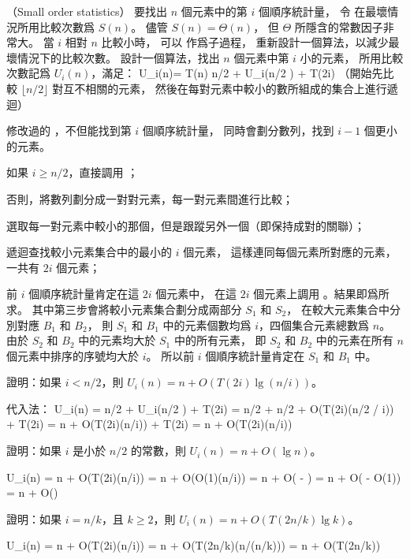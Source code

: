 \startPROBLEM
（Small order statistics）
要找出 $n$ 個元素中的第 $i$ 個順序統計量，
令  在最壞情況所用比較次數爲 $S(n)$。
儘管 $S(n)=\Theta(n)$，
但 $\Theta$ 所隱含的常數因子非常大。
當 $i$ 相對 $n$ 比較小時，
可以  作爲子過程，
重新設計一個算法，以減少最壞情況下的比較次數。
\startigBase[a]\startitem
設計一個算法，找出 $n$ 個元素中第 $i$ 小的元素，
所用比較次數記爲 $U_i(n)$，滿足：
\startformula
U_i(n)=\startmathcases
\NC T(n) \NC {} \NR
\NC \lfloor n/2 \rfloor + U_i(\lceil n/2 \rceil) + T(2i) \NC {} \NR
\stopmathcases
\stopformula
（\hint 開始先比較 $\lfloor n/2\rfloor$ 對互不相關的元素，
然後在每對元素中較小的數所組成的集合上進行遞迴）
\stopitem\stopigBase

\startANSWER
修改過的 ，不但能找到第 $i$ 個順序統計量，
同時會劃分數列，找到 $i-1$ 個更小的元素。
\startigNum
\item 如果 $i\ge n/2$，直接調用 ；
\item 否則，將數列劃分成一對對元素，每一對元素間進行比較；
\item 選取每一對元素中較小的那個，但是跟蹤另外一個（即保持成對的關聯）；
\item 遞迴查找較小元素集合中的最小的 $i$ 個元素，
這樣連同每個元素所對應的元素，一共有 $2i$ 個元素；
\item 前 $i$ 個順序統計量肯定在這 $2i$ 個元素中，
在這 $2i$ 個元素上調用 。結果即爲所求。
\stopigNum
其中第三步會將較小元素集合劃分成兩部分 $S_1$ 和 $S_2$，
在較大元素集合中分別對應 $B_1$ 和 $B_2$，
則 $S_1$ 和 $B_1$ 中的元素個數均爲 $i$，四個集合元素總數爲 $n$。
由於 $S_2$ 和 $B_2$ 中的元素均大於 $S_1$ 中的所有元素，
即 $S_2$ 和 $B_2$ 中的元素在所有 $n$ 個元素中排序的序號均大於 $i$。
所以前 $i$ 個順序統計量肯定在 $S_1$ 和 $B_1$ 中。
\stopANSWER

\startigBase[continue]\startitem
證明：如果 $i<n/2$，則 $U_i(n)=n+O(T(2i)\lg(n/i))$。
\stopitem\stopigBase

\startANSWER
代入法：
\startsplitformula\startmathalignment
\NC U_i(n)
    \NC = \lfloor n/2 \rfloor + U_i(\lceil n/2 \rceil) + T(2i) \NR
\NC \NC = \lfloor n/2 \rfloor + \lceil n/2 \rceil +
             O(T(2i)\lg(\lfloor n/2 \rfloor / i)) + T(2i) \NR
\NC \NC = n + O(T(2i)\lg(n/i)) + T(2i) \NR
\NC \NC = n + O(T(2i)\lg(n/i)) \NR
\stopmathalignment\stopsplitformula
\stopANSWER

\startigBase[continue]\startitem
證明：如果 $i$ 是小於 $n/2$ 的常數，則 $U_i(n)=n+O(\lg{n})$。
\stopitem\stopigBase

\startANSWER
\startsplitformula\startmathalignment
\NC U_i(n)
    \NC = n + O(T(2i)\lg(n/i)) \NR
\NC \NC = n + O(O(1)\lg(n/i)) \NR
\NC \NC = n + O( - ) \NR
\NC \NC = n + O( - O(1)) \NR
\NC \NC = n + O() \NR
\stopmathalignment\stopsplitformula
\stopANSWER

\startigBase[continue]\startitem
證明：如果 $i=n/k$，且 $k\ge 2$，則 $U_i(n)=n+O(T(2n/k)\lg{k})$。
\stopitem\stopigBase

\startANSWER
\startsplitformula\startmathalignment
\NC U_i(n)
    \NC = n + O(T(2i)\lg(n/i)) \NR
\NC \NC = n + O(T(2n/k)\lg(n/(n/k))) \NR
\NC \NC = n + O(T(2n/k)) \NR
\stopmathalignment\stopsplitformula
\stopANSWER

\stopPROBLEM
